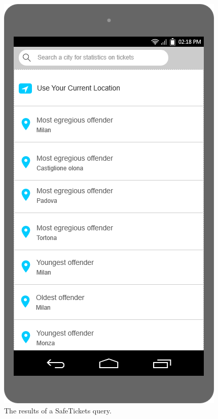 \documentclass[./main.tex]{subfiles}
\begin{document}
\clearpage

\begin{figure}
    \centering
    \begin{minipage}[t]{\mockupdimension}
        \includegraphics[width=\textwidth]{resources/Mockups/tickets_statistics}
        \caption{The results of a SafeTickets query.}
        \label{fig:ticket_statistics}

\end{minipage}
\end{figure}
\end{document}
